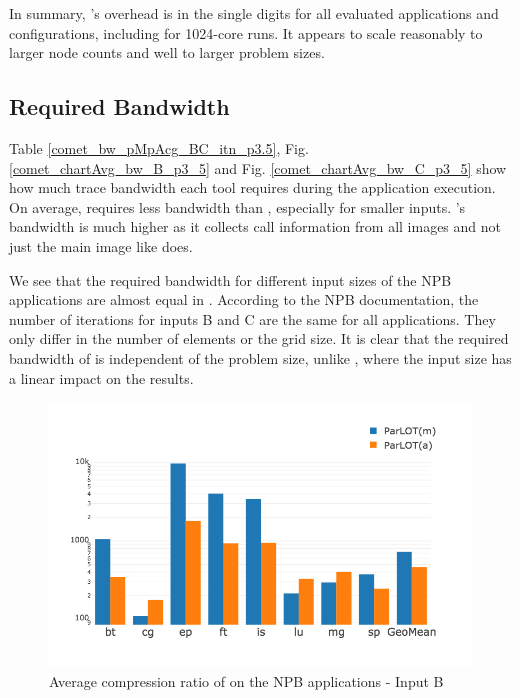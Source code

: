 In summary, \parlot 's overhead is in the single digits for all evaluated applications and configurations, including for 1024-core runs. It appears to scale reasonably to larger node counts and well to larger problem sizes.

\subsection{Required Bandwidth}
\label{subsec:lowbw}

Table \ref{comet_bw_pMpAcg_BC_itn_p3.5}, Fig.  \ref{comet_chartAvg_bw_B_p3_5} and Fig. \ref{comet_chartAvg_bw_C_p3_5} show how much trace bandwidth each tool
requires
during the application execution.
%
On average, \parlotm requires less bandwidth than
\callgrind, especially for smaller inputs.
%
\parlota's bandwidth is much higher as it collects call information from all
images and not just the main image like \parlotm does.

We see that the required bandwidth for different input sizes of the NPB applications are almost equal in \parlot. According to the NPB documentation, the number of iterations for inputs B and C are the same for all applications. They only differ in the number of elements or the grid size. It is clear that the required bandwidth of \parlot is independent of the problem size, unlike \callgrind, where the input size has a linear impact on the results.

%
\begin{figure}[b]
\centering
\includegraphics[width=.75\textwidth]{parlot/figs.comet.newMed/comet_chartAvg_cr_B_p3_5.png}
\caption{ Average compression ratio of \parlot on the NPB applications - Input B}
\label{comet_chartAvg_cr_B_p3_5}
\end{figure}

